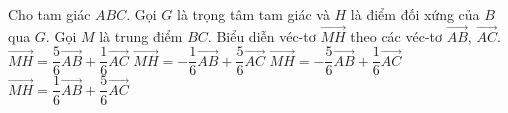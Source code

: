 \begin{ex}%
	Cho tam giác $ABC$. Gọi $G$ là trọng tâm tam giác và $H$ là điểm đối xứng của $B$ qua $G$. Gọi $M$ là trung điểm $BC$. Biểu diễn véc-tơ $\vec{MH}$ theo các véc-tơ $\vec{AB},\,\vec{AC}.$
	\choice
	{$\vec{MH}=\dfrac{5}{6}\vec{AB}+\dfrac{1}{6}\vec{AC}$}
	{$\vec{MH}=-\dfrac{1}{6}\vec{AB}+\dfrac{5}{6}\vec{AC}$}
	{\True $\vec{MH}=-\dfrac{5}{6}\vec{AB}+\dfrac{1}{6}\vec{AC}$}
	{$\vec{MH}=\dfrac{1}{6}\vec{AB}+\dfrac{5}{6}\vec{AC}$}
\end{ex}

